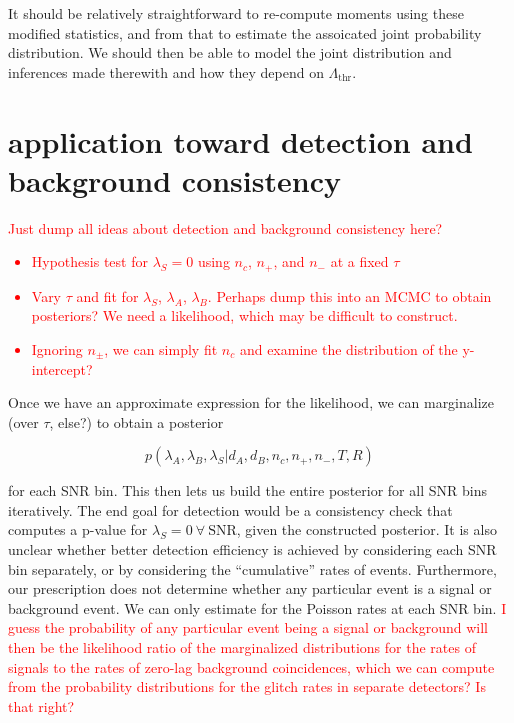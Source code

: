 \documentclass{article}
\newcommand{\rate}[1]{\lambda_{#1}}
\newcommand{\la}{\rate{A}}
\newcommand{\lb}{\rate{B}}
\newcommand{\ls}{\rate{S}}
\begin{document}
It should be relatively straightforward to re-compute moments using these modified statistics, and from that to estimate the assoicated joint probability distribution. 
We should then be able to model the joint distribution and inferences made therewith and how they depend on $\Lambda_\mathrm{thr}$.

\section{application toward detection and background consistency}

\textcolor{red}{
Just dump all ideas about detection and background consistency here?
\begin{itemize}
	\item{Hypothesis test for $\ls=0$ using $n_c$, $n_+$, and $n_-$ at a fixed $\tau$}
	\item{Vary $\tau$ and fit for $\ls$, $\la$, $\lb$. Perhaps dump this into an MCMC to obtain posteriors? We need a likelihood, which may be difficult to construct.}
	\item{Ignoring $n_\pm$, we can simply fit $n_c$ and examine the distribution of the y-intercept?}
\end{itemize}
}

Once we have an approximate expression for the likelihood, we can marginalize (over $\tau$, else?) to obtain a posterior 

\begin{equation}
	p(\la, \lb, \ls | d_A, d_B, n_c, n_+, n_-, T, R)
\end{equation}

for each SNR bin.
This then lets us build the entire posterior for all SNR bins iteratively.
The end goal for detection would be a consistency check that computes a p-value for $\ls=0\ \forall\ \text{SNR}$, given the constructed posterior.
It is also unclear whether better detection efficiency is achieved by considering each SNR bin separately, or by considering the ``cumulative'' rates of events.
Furthermore, our prescription does not determine whether any particular event is a signal or background event.
We can only estimate for the Poisson rates at each SNR bin.
\textcolor{red}{
I guess the probability of any particular event being a signal or background will then be the likelihood ratio of the marginalized distributions for the rates of signals to the rates of zero-lag background coincidences, which we can compute from the probability distributions for the glitch rates in separate detectors?
Is that right?
}
\end{document}
